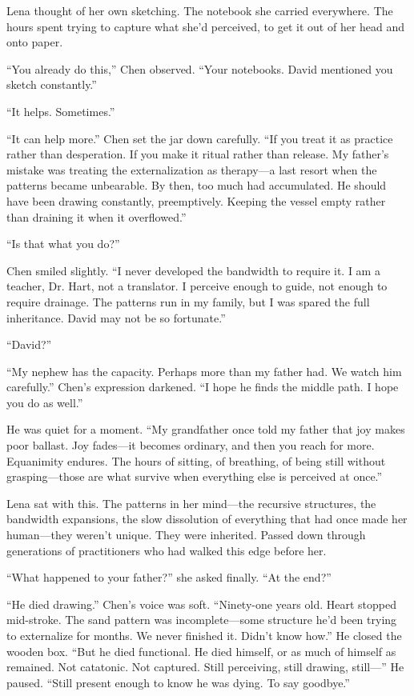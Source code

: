 Lena thought of her own sketching. The notebook she carried everywhere. The hours spent trying to capture what she'd perceived, to get it out of her head and onto paper.

``You already do this,'' Chen observed. ``Your notebooks. David mentioned you sketch constantly.''

``It helps. Sometimes.''

``It can help more.'' Chen set the jar down carefully. ``If you treat it as practice rather than desperation. If you make it ritual rather than release. My father's mistake was treating the externalization as therapy—a last resort when the patterns became unbearable. By then, too much had accumulated. He should have been drawing constantly, preemptively. Keeping the vessel empty rather than draining it when it overflowed.''

``Is that what you do?''

Chen smiled slightly. ``I never developed the bandwidth to require it. I am a teacher, Dr. Hart, not a translator. I perceive enough to guide, not enough to require drainage. The patterns run in my family, but I was spared the full inheritance. David may not be so fortunate.''

``David?''

``My nephew has the capacity. Perhaps more than my father had. We watch him carefully.'' Chen's expression darkened. ``I hope he finds the middle path. I hope you do as well.''

He was quiet for a moment. ``My grandfather once told my father that joy makes poor ballast. Joy fades—it becomes ordinary, and then you reach for more. Equanimity endures. The hours of sitting, of breathing, of being still without grasping—those are what survive when everything else is perceived at once.''

Lena sat with this. The patterns in her mind—the recursive structures, the bandwidth expansions, the slow dissolution of everything that had once made her human—they weren't unique. They were inherited. Passed down through generations of practitioners who had walked this edge before her.

``What happened to your father?'' she asked finally. ``At the end?''

``He died drawing.'' Chen's voice was soft. ``Ninety-one years old. Heart stopped mid-stroke. The sand pattern was incomplete—some structure he'd been trying to externalize for months. We never finished it. Didn't know how.'' He closed the wooden box. ``But he died functional. He died himself, or as much of himself as remained. Not catatonic. Not captured. Still perceiving, still drawing, still—'' He paused. ``Still present enough to know he was dying. To say goodbye.''

